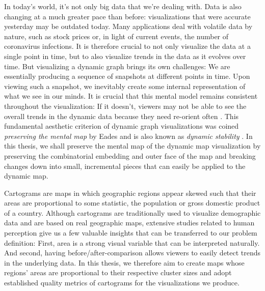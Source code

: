 In today's world, it's not only big data that we're dealing with.
Data is also changing at a much greater pace than before: visualizations that were accurate yesterday may be outdated today.
Many applications deal with volatile data by nature, such as stock prices or, in light of current events, the number of coronavirus infections.
It is therefore crucial to not only visualize the data at a single point in time, but to also visualize trends in the data as it evolves over time.
But visualizing a dynamic graph brings its own challenges:
We are essentially producing a sequence of snapshots at different points in time.
Upon viewing such a snapshot, we inevitably create some internal representation of what we see in our minds.
It is crucial that this mental model remains consistent throughout the visualization:
If it doesn't, viewers may not be able to see the overall trends in the dynamic data because they need re-orient often \cite{bohringer1990using} \cite{lee2006mental} \cite{purchase2006important}.
This fundamental aesthetic criterion of dynamic graph visualizations was coined \emph{preserving the mental map} by Eades \etal{} \cite{eades1991preserving} \cite{misue1995layout} and is also known as \emph{dynamic stability} \cite{diehl2002graphs}.
In this thesis, we shall preserve the mental map of the dynamic map visualization by preserving the combinatorial embedding and outer face of the map and breaking changes down into small, incremental pieces that can easily be applied to the dynamic map.

Cartograms are maps in which geographic regions appear skewed such that their areas are proportional to some statistic, \eg{} the population or gross domestic product of a country.
Although cartograms are traditionally used to visualize demographic data and are based on real geographic maps, extensive studies related to human perception \cite{nusrat2016state} \cite{nusrat2018evaluating} give us a few valuable insights that can be transferred to our problem definition:
First, area is a strong visual variable that can be interpreted naturally.
And second, having before/after-comparison allows viewers to easily detect trends in the underlying data.
In this thesis, we therefore aim to create maps whose regions' areas are proportional to their respective cluster sizes and adopt established quality metrics of cartograms for the visualizations we produce.

